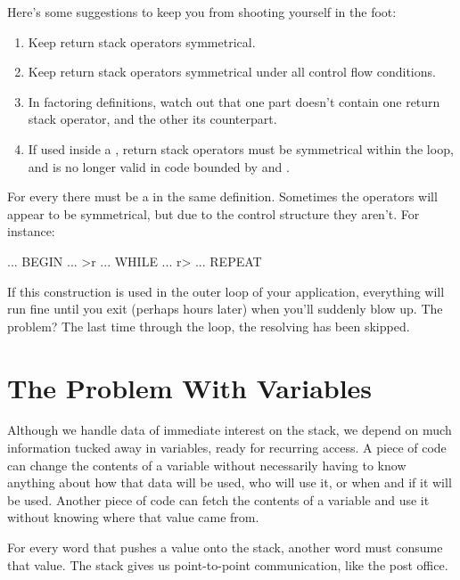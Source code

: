 Here's some suggestions to keep you from shooting yourself in the
foot:

\begin{tip}
\begin{enumerate}
\item Keep return stack operators symmetrical.
\item Keep return stack operators symmetrical under all control flow
conditions.
\item In factoring definitions, watch out that one part doesn't contain
one return stack operator, and the other its counterpart.
\item If used inside a , return stack operators
must be symmetrical within the loop, and  is no longer valid in
code bounded by  and .
\end{enumerate}
\end{tip}
For every  there must be a  in the same definition.
Sometimes the operators will appear to be symmetrical, but due to the
control structure they aren't. For instance:

\begin{Code}
... BEGIN ... >r ... WHILE ... r> ... REPEAT
\end{Code}
If this construction is used in the outer loop of your application,
everything will run fine until you exit (perhaps hours later) when you'll
suddenly blow up. The problem? The last time through the loop, the
resolving  has been skipped.%

\section{The Problem With Variables}%

Although we handle data of immediate interest on the stack, we depend
on much information tucked away in variables, ready for recurring access.
A piece of code can change the contents of a variable without
necessarily having to know anything about how that data will be used,
who will use it, or when and if it will be used. Another piece of code can
fetch the contents of a variable and use it without knowing where that
value came from.

For every word that pushes a value onto the stack, another word
must consume that value. The stack gives us point-to-point communication,
like the post office.

